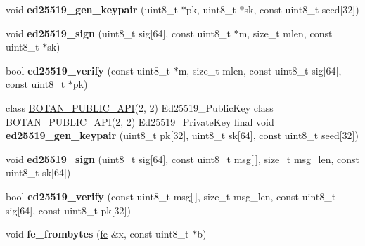 \begin{DoxyCompactItemize}
\item 
\mbox{\label{namespace_botan_a5e320e332f0864eefe5c84e40abe7b0d}} 
void {\bfseries ed25519\+\_\+gen\+\_\+keypair} (uint8\+\_\+t $\ast$pk, uint8\+\_\+t $\ast$sk, const uint8\+\_\+t seed\mbox{[}32\mbox{]})
\item 
\mbox{\label{namespace_botan_ae0e36e9fdc130d658129a97dbd8a2730}} 
void {\bfseries ed25519\+\_\+sign} (uint8\+\_\+t sig\mbox{[}64\mbox{]}, const uint8\+\_\+t $\ast$m, size\+\_\+t mlen, const uint8\+\_\+t $\ast$sk)
\item 
\mbox{\label{namespace_botan_a5a19da308b70ce780f2895275863fb84}} 
bool {\bfseries ed25519\+\_\+verify} (const uint8\+\_\+t $\ast$m, size\+\_\+t mlen, const uint8\+\_\+t sig\mbox{[}64\mbox{]}, const uint8\+\_\+t $\ast$pk)
\item 
\mbox{\label{namespace_botan_a06c04ff64a486db50cc6e3b72fd6329a}} 
class \mbox{\hyperlink{namespace_botan_a6b9388030d872e586a4655b776ac9501}{B\+O\+T\+A\+N\+\_\+\+P\+U\+B\+L\+I\+C\+\_\+\+A\+PI}}(2, 2) Ed25519\+\_\+\+Public\+Key class \mbox{\hyperlink{namespace_botan_a6b9388030d872e586a4655b776ac9501}{B\+O\+T\+A\+N\+\_\+\+P\+U\+B\+L\+I\+C\+\_\+\+A\+PI}}(2, 2) Ed25519\+\_\+\+Private\+Key final void {\bfseries ed25519\+\_\+gen\+\_\+keypair} (uint8\+\_\+t pk\mbox{[}32\mbox{]}, uint8\+\_\+t sk\mbox{[}64\mbox{]}, const uint8\+\_\+t seed\mbox{[}32\mbox{]})
\item 
\mbox{\label{namespace_botan_a4f80dc55d276a7421eadfbf91c2bcb69}} 
void {\bfseries ed25519\+\_\+sign} (uint8\+\_\+t sig\mbox{[}64\mbox{]}, const uint8\+\_\+t msg\mbox{[}$\,$\mbox{]}, size\+\_\+t msg\+\_\+len, const uint8\+\_\+t sk\mbox{[}64\mbox{]})
\item 
\mbox{\label{namespace_botan_adfcfbdead133000fa479ef04954bda6d}} 
bool {\bfseries ed25519\+\_\+verify} (const uint8\+\_\+t msg\mbox{[}$\,$\mbox{]}, size\+\_\+t msg\+\_\+len, const uint8\+\_\+t sig\mbox{[}64\mbox{]}, const uint8\+\_\+t pk\mbox{[}32\mbox{]})
\item 
\mbox{\label{namespace_botan_adf6c34106e10d22d332f6887d8c01437}} 
void {\bfseries fe\+\_\+frombytes} (\mbox{\hyperlink{class_botan_1_1_f_e__25519}{fe}} \&x, const uint8\+\_\+t $\ast$b)

\end{DoxyCompactItemize}
